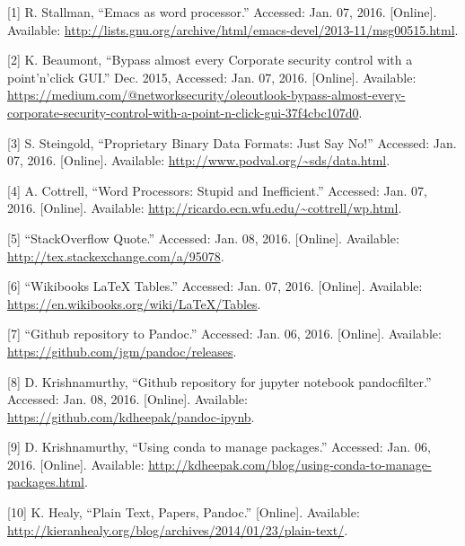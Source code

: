 \documentclass[journal,]{IEEEtran}
\begin{document}
\hypertarget{refs}{}
\begin{cslreferences}
\leavevmode\hypertarget{ref-stallman_emacs_nodate}{}%
{[}1{]} R. Stallman, ``Emacs as word processor.'' Accessed: Jan. 07,
2016. {[}Online{]}. Available:
\url{http://lists.gnu.org/archive/html/emacs-devel/2013-11/msg00515.html}.

\leavevmode\hypertarget{ref-beaumont_bypass_2015}{}%
{[}2{]} K. Beaumont, ``Bypass almost every Corporate security control
with a point'n'click GUI.'' Dec. 2015, Accessed: Jan. 07, 2016.
{[}Online{]}. Available:
\url{https://medium.com/@networksecurity/oleoutlook-bypass-almost-every-corporate-security-control-with-a-point-n-click-gui-37f4cbc107d0}.

\leavevmode\hypertarget{ref-steingold_proprietary_nodate}{}%
{[}3{]} S. Steingold, ``Proprietary Binary Data Formats: Just Say No!''
Accessed: Jan. 07, 2016. {[}Online{]}. Available:
\url{http://www.podval.org/~sds/data.html}.

\leavevmode\hypertarget{ref-cottrell_word_nodate}{}%
{[}4{]} A. Cottrell, ``Word Processors: Stupid and Inefficient.''
Accessed: Jan. 07, 2016. {[}Online{]}. Available:
\url{http://ricardo.ecn.wfu.edu/~cottrell/wp.html}.

\leavevmode\hypertarget{ref-noauthor_stackoverflow_nodate}{}%
{[}5{]} ``StackOverflow Quote.'' Accessed: Jan. 08, 2016. {[}Online{]}.
Available: \url{http://tex.stackexchange.com/a/95078}.

\leavevmode\hypertarget{ref-noauthor_wikibooks_nodate}{}%
{[}6{]} ``Wikibooks LaTeX Tables.'' Accessed: Jan. 07, 2016.
{[}Online{]}. Available:
\url{https://en.wikibooks.org/wiki/LaTeX/Tables}.

\leavevmode\hypertarget{ref-noauthor_github_nodate}{}%
{[}7{]} ``Github repository to Pandoc.'' Accessed: Jan. 06, 2016.
{[}Online{]}. Available: \url{https://github.com/jgm/pandoc/releases}.

\leavevmode\hypertarget{ref-krishnamurthy_github_nodate}{}%
{[}8{]} D. Krishnamurthy, ``Github repository for jupyter notebook
pandocfilter.'' Accessed: Jan. 08, 2016. {[}Online{]}. Available:
\url{https://github.com/kdheepak/pandoc-ipynb}.

\leavevmode\hypertarget{ref-krishnamurthy_using_nodate}{}%
{[}9{]} D. Krishnamurthy, ``Using conda to manage packages.'' Accessed:
Jan. 06, 2016. {[}Online{]}. Available:
\url{http://kdheepak.com/blog/using-conda-to-manage-packages.html}.

\leavevmode\hypertarget{ref-healy_plain_nodate}{}%
{[}10{]} K. Healy, ``Plain Text, Papers, Pandoc.'' {[}Online{]}.
Available:
\url{http://kieranhealy.org/blog/archives/2014/01/23/plain-text/}.


\end{cslreferences}
\end{document}
